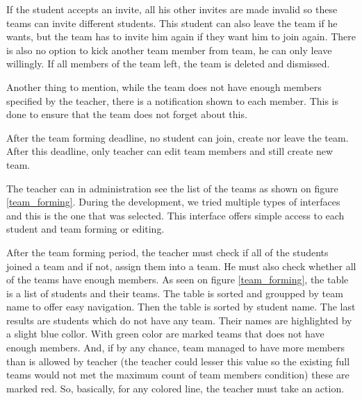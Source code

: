 If the student accepts an invite, all his other invites are made invalid so these teams can invite different students. This student can also leave the team if he wants, but the team has to invite him again if they want him to join again. There is also no option to kick another team member from team, he can only leave willingly. If all members of the team left, the team is deleted and dismissed.

Another thing to mention, while the team does not have enough members specified by the teacher, there is a notification shown to each member. This is done to ensure that the team does not forget about this.

After the team forming deadline, no student can join, create nor leave the team. After this deadline, only teacher can edit team members and still create new team. 

The teacher can in administration see the list of the teams as shown on figure \ref{team_forming}. During the development, we tried multiple types of interfaces and this is the one that was selected. This interface offers simple access to each student and team forming or editing.

After the team forming period, the teacher must check if all of the students joined a team and if not, assign them into a team. He must also check whether all of the teams have enough members. As seen on figure \ref{team_forming}, the table is a list of students and their teams. The table is sorted and groupped by team name to offer easy navigation. Then the table is sorted by student name. The last results are students which do not have any team. Their names are highlighted by a slight blue collor. With green color are marked teams that does not have enough members. And, if by any chance, team managed to have more members than is allowed by teacher (the teacher could lesser this value so the existing full teams would not met the maximum count of team members condition) these are marked red. So, basically, for any colored line, the teacher must take an action.


